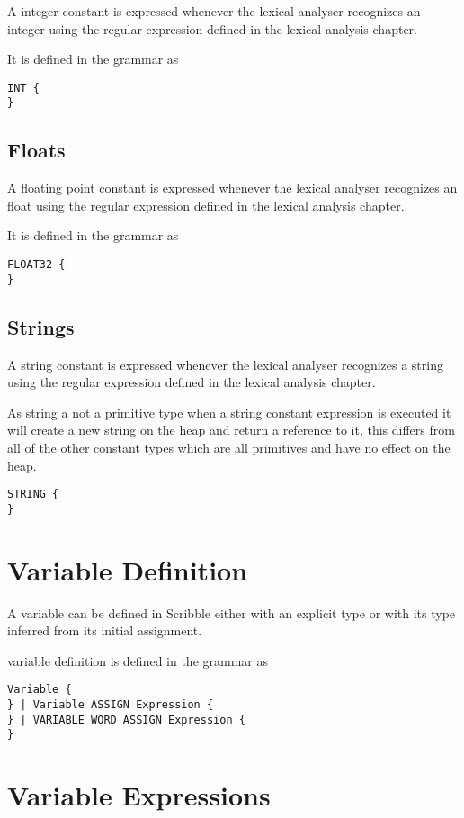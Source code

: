 \documentclass[]{final_report}
\begin{document}
A integer constant is expressed whenever the lexical analyser recognizes an integer using the regular expression defined in the lexical analysis chapter.

It is defined in the grammar as
\begin{verbatim}
INT {
}
\end{verbatim}

\subsection{Floats}

A floating point constant is expressed whenever the lexical analyser recognizes an float using the regular expression defined in the lexical analysis chapter.

It is defined in the grammar as
\begin{verbatim}
FLOAT32 {
}
\end{verbatim}

\subsection{Strings}

A string constant is expressed whenever the lexical analyser recognizes a string using the regular expression defined in the lexical analysis chapter.

As string a not a primitive type when a string constant expression is executed it will create a new string on the heap and return a reference to it, this differs from all of the other constant types which are all primitives and have no effect on the heap.

\begin{verbatim}
STRING {
}
\end{verbatim}

\section{Variable Definition}

A variable can be defined in Scribble either with an explicit type or with its type inferred from its initial assignment.

variable definition is defined in the grammar as
\begin{verbatim}
Variable {
} | Variable ASSIGN Expression {
} | VARIABLE WORD ASSIGN Expression {
}
\end{verbatim}

\section{Variable Expressions}
\end{document}

